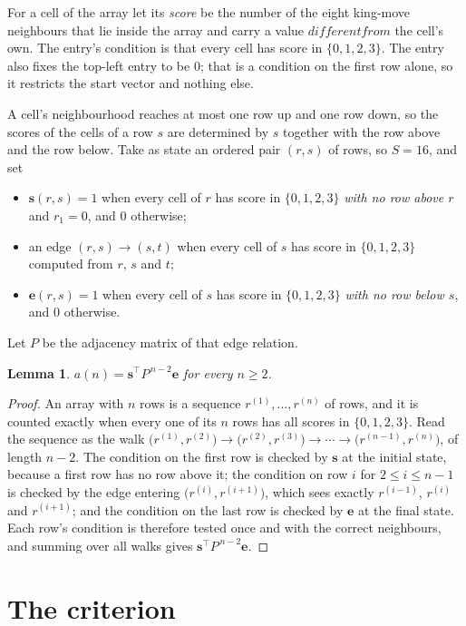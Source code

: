 \documentclass[11pt,a4paper]{article}
\theoremstyle{plain}
\newtheorem{lemma}[theorem]{Lemma}
\theoremstyle{definition}
\begin{document}
For a cell of the array let its \emph{score} be the number of the eight king-move neighbours that lie inside
the array and carry a value $different from$ the cell's own. The entry's condition is that every cell
has score in $\{0,1,2,3\}$. The entry also fixes the top-left entry to be $0$; that is a condition on the first row alone, so it restricts the start vector and nothing else.

A cell's neighbourhood reaches at most one row up and one row down, so the scores of the
cells of a row $s$ are determined by $s$ together with the row above and the row below.
Take as state an ordered pair $(r,s)$ of rows, so $S=16$, and set
\begin{itemize}
\item $\mathbf{s}(r,s)=1$ when every cell of $r$ has score in $\{0,1,2,3\}$ \emph{with no row
above $r$} and $r_1=0$, and $0$ otherwise;
\item an edge $(r,s)\to(s,t)$ when every cell of $s$ has score in $\{0,1,2,3\}$ computed from
$r$, $s$ and $t$;
\item $\mathbf{e}(r,s)=1$ when every cell of $s$ has score in $\{0,1,2,3\}$ \emph{with no row
below $s$}, and $0$ otherwise.
\end{itemize}
Let $P$ be the adjacency matrix of that edge relation.

\begin{lemma}\label{lem:walk}
$a(n)=\mathbf{s}^{\!\top}P^{\,n-2}\mathbf{e}$ for every $n\ge2$.
\end{lemma}

\begin{proof}
An array with $n$ rows is a sequence $r^{(1)},\dots,r^{(n)}$ of rows, and it is counted
exactly when every one of its $n$ rows has all scores in $\{0,1,2,3\}$. Read the sequence as the
walk $\bigl(r^{(1)},r^{(2)}\bigr)\to\bigl(r^{(2)},r^{(3)}\bigr)\to\cdots\to
\bigl(r^{(n-1)},r^{(n)}\bigr)$, of length $n-2$. The condition on the first row is
checked by $\mathbf{s}$ at the initial state, because a first row has no row above it; the
condition on row $i$ for $2\le i\le n-1$ is checked by the edge entering
$\bigl(r^{(i)},r^{(i+1)}\bigr)$, which sees exactly $r^{(i-1)}$, $r^{(i)}$ and
$r^{(i+1)}$; and the condition on the last row is checked by $\mathbf{e}$ at the final
state. Each row's condition is therefore tested once and with the correct neighbours, and
summing over all walks gives $\mathbf{s}^{\!\top}P^{\,n-2}\mathbf{e}$.
\end{proof}

\section{The criterion}
\end{document}
